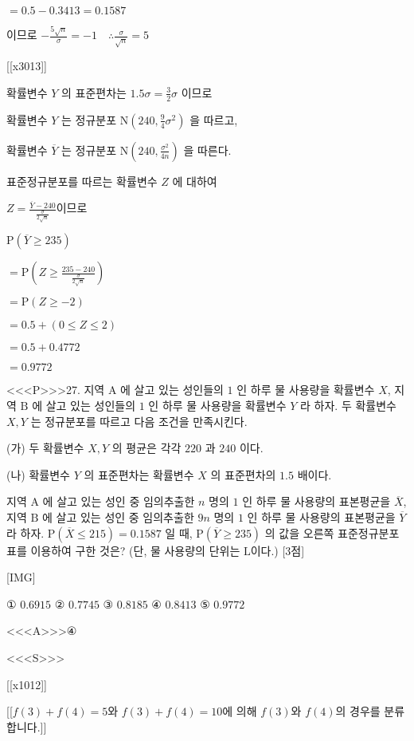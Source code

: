 \documentclass{oblivoir}
\begin{document}
$= 0.5-0.3413=0.1587$

이므로 $-\frac{5 \sqrt{n}}{\sigma}=-1 \quad \therefore \frac{\sigma}{\sqrt{n}}=5$

[[x3013]]

확률변수 $Y$ 의 표준편차는 $1.5 \sigma=\frac{3}{2} \sigma$ 이므로

확률변수 $Y$ 는 정규분포 $\mathrm{N}\left(240, \frac{9}{4} \sigma^{2}\right)$ 을 따르고,

확률변수 $\overline{Y}$ 는 정규분포 $\mathrm{N}\left(240, \frac{\sigma^{2}}{4 n}\right)$ 을 따른다.

표준정규분포를 따르는 확률변수 $Z$ 에 대하여

$Z=\frac{\overline{Y}-240}{\frac{\sigma}{2 \sqrt{n}}}$이므로

$\mathrm{P}(\overline{Y} \geq 235) $

$=\mathrm{P}\left(Z \geq \frac{235-240}{\frac{\sigma}{2 \sqrt{n}}}\right)$

$=\mathrm{P}(Z \geq-2)$

$=0.5+(0 \leq Z \leq 2)$

$=0.5+0.4772$

$=0.9772$


<<<P>>>27. 지역 $\mathrm{A}$ 에 살고 있는 성인들의 $1$ 인 하루 물 사용량을 확률변수 $X$, 지역 $\mathrm{B}$ 에 살고 있는 성인들의 $1$ 인 하루 물 사용량을 확률변수 $Y$ 라 하자. 두 확률변수 $X, Y$ 는 정규분포를 따르고 다음 조건을 만족시킨다.

(가) 두 확률변수 $X, Y$ 의 평균은 각각 $220$ 과 $240$ 이다.

(나) 확률변수 $Y$ 의 표준편차는 확률변수 $X$ 의 표준편차의 $1.5$ 배이다.

지역 $\mathrm{A}$ 에 살고 있는 성인 중 임의추출한 $n$ 명의 $1$ 인 하루 물 사용량의 표본평균을 $\overline{X}$, 지역 $\mathrm{B}$ 에 살고 있는 성인 중 임의추출한 $9 n$ 명의 $1$ 인 하루 물 사용량의 표본평균을 $\overline{Y}$ 라 하자. $\mathrm{P}(\overline{X} \leq 215)=0.1587$ 일 때, $\mathrm{P}(\overline{Y} \geq 235)$ 의 값을 오른쪽 표준정규분포표를 이용하여 구한 것은? (단, 물 사용량의 단위는 $\mathrm{L}$이다.) [3점]

[IMG]

① $0.6915$
② $0.7745$
③ $0.8185$
④ $0.8413$
⑤ $0.9772$



<<<A>>>④

<<<S>>>

[[x1012]]

[[$f(3)+f(4)=5$와 $f(3)+f(4)=10$에 의해 $f(3)$와 $f(4)$의 경우를 분류합니다.]]
\end{document}
